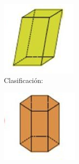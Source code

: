 \begin{figure}[H]
    \\
    \begin{subfigure}{.25\linewidth}
        \centering
        \includegraphics[width=.8\linewidth]{../images/sinma2_aiu3_ac79_img05}
        \caption{Clasificación:\\}
        \label{sfig:sinma2_aiu3_ac79_img05}
    \end{subfigure}\qquad
    \begin{subfigure}{.18\linewidth}
        \centering
        \includegraphics[width=\linewidth]{../images/sinma2_aiu3_ac79_img06}

\end{subfigure}
\end{figure}
